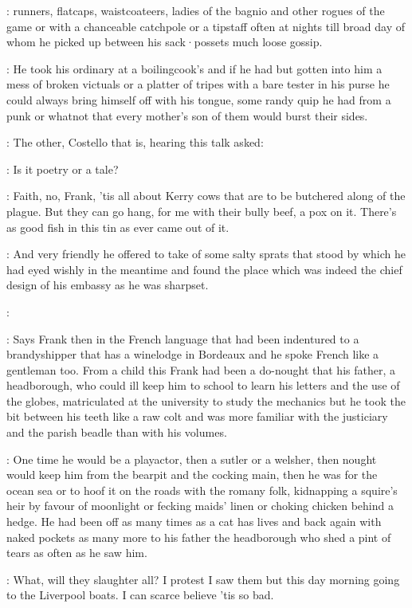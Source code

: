 :
runners,
flatcaps,
waistcoateers,
ladies of the bagnio and other
rogues of the game or with a chanceable catchpole or a tipstaff often at
nights till broad day of whom he picked up between his sack·possets
much loose gossip.

:
He took his ordinary at a boilingcook's and if he had but gotten into
him a mess of broken victuals or a platter of tripes with a bare tester in
his purse he could always bring himself off with his tongue,
some randy
quip he had from a punk or whatnot that every mother's son of them would
burst their sides.

:
The other,
Costello that is,
hearing this talk asked:

\punch:
Is it poetry or a tale?

\lenehan:
Faith,
no,
Frank,
'tis all about Kerry cows that are to be butchered
along of the plague.
But they can go hang,
for me with their bully beef,
a
pox on it.
There's as good fish in this tin as ever came out of it.

:
And very friendly he offered to take of some salty sprats that stood
by which he had eyed wishly in the meantime
and found the place which was
indeed the chief design of his embassy as he was sharpset.

\punch:

:
Says Frank then in the French language that had been indentured to a
brandyshipper that has a winelodge in Bordeaux and he spoke French like a
gentleman too.
From a child this Frank had been a do-nought that his
father,
a headborough,
who could ill keep him to school to learn his
letters and the use of the globes,
matriculated at the university to study
the mechanics but he took the bit between his teeth like a raw colt and
was more familiar with the justiciary and the parish beadle than with his
volumes.

:
One time he would be a playactor,
then a sutler or a welsher,
then nought would keep him from the bearpit and the cocking main,
then he
was for the ocean sea or to hoof it on the roads with the romany folk,
kidnapping a squire's heir by favour of moonlight or fecking maids' linen
or choking chicken behind a hedge.
He had been off as many times as a cat
has lives and back again with naked pockets as many more to his father
the headborough who shed a pint of tears as often as he saw him.

\Bloom:
What,
will they slaughter all?
I protest I saw them but this day
morning going to the Liverpool boats.
I can scarce believe 'tis so bad.

